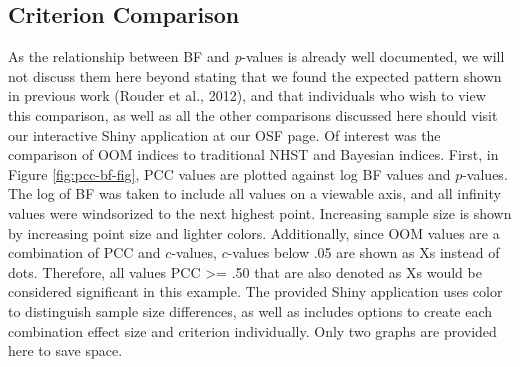 \documentclass[english,man]{apa6}
\theoremstyle{definition}
\theoremstyle{definition}
\theoremstyle{definition}
\theoremstyle{remark}
\begin{document}
\subsection{Criterion Comparison}\label{criterion-comparison}

As the relationship between BF and \emph{p}-values is already well
documented, we will not discuss them here beyond stating that we found
the expected pattern shown in previous work (Rouder et al., 2012), and
that individuals who wish to view this comparison, as well as all the
other comparisons discussed here should visit our interactive Shiny
application at our OSF page. Of interest was the comparison of OOM
indices to traditional NHST and Bayesian indices. First, in Figure
\ref{fig:pcc-bf-fig}, PCC values are plotted against log BF values and
\(p\)-values. The log of BF was taken to include all values on a
viewable axis, and all infinity values were windsorized to the next
highest point. Increasing sample size is shown by increasing point size
and lighter colors. Additionally, since OOM values are a combination of
PCC and \(c\)-values, \(c\)-values below .05 are shown as Xs instead of
dots. Therefore, all values PCC \textgreater{}= .50 that are also
denoted as Xs would be considered significant in this example. The
provided Shiny application uses color to distinguish sample size
differences, as well as includes options to create each combination
effect size and criterion individually. Only two graphs are provided
here to save space.
\end{document}
